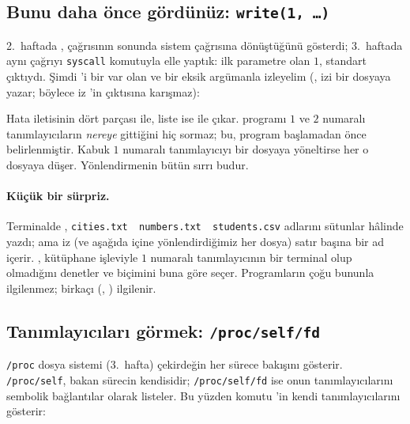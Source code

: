 \subsection{Bunu daha önce gördünüz: \texttt{write(1, \dots)}}

2.~haftada ,  çağrısının sonunda  sistem çağrısına dönüştüğünü gösterdi; 3.~haftada aynı çağrıyı \texttt{syscall} komutuyla elle yaptık: ilk parametre olan $1$, standart çıktıydı. Şimdi 'i bir var olan ve bir eksik argümanla izleyelim (, izi bir dosyaya yazar; böylece iz 'in çıktısına karışmaz):



Hata iletisinin dört parçası  ile, liste ise  ile çıkar.  programı $1$ ve $2$ numaralı tanımlayıcıların \emph{nereye} gittiğini hiç sormaz; bu, program başlamadan önce belirlenmiştir. Kabuk $1$ numaralı tanımlayıcıyı bir dosyaya yöneltirse her  o dosyaya düşer. Yönlendirmenin bütün sırrı budur.

\paragraph{Küçük bir sürpriz.} Terminalde , \texttt{cities.txt\ \ numbers.txt\ \ students.csv} adlarını sütunlar hâlinde yazdı; ama iz (ve aşağıda içine yönlendirdiğimiz her dosya) satır başına bir ad içerir. ,  kütüphane işleviyle $1$ numaralı tanımlayıcının bir terminal olup olmadığını denetler ve biçimini buna göre seçer. Programların çoğu bununla ilgilenmez; birkaçı (, ) ilgilenir.

\subsection{Tanımlayıcıları görmek: \texttt{/proc/self/fd}}

\texttt{/proc} dosya sistemi (3.~hafta) çekirdeğin her sürece bakışını gösterir. \texttt{/proc/self}, bakan sürecin kendisidir; \texttt{/proc/self/fd} ise onun tanımlayıcılarını sembolik bağlantılar olarak listeler. Bu yüzden  komutu 'in kendi tanımlayıcılarını gösterir:



